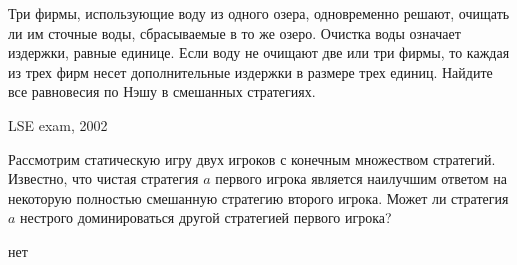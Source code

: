 \begin{problem}[Экология]
\begin{source}
\cite{gintis:gte}\end{source}
Три фирмы, использующие воду из одного озера, одновременно решают, очищать ли им сточные воды, сбрасываемые в то же озеро. Очистка воды означает издержки, равные единице. Если воду не очищают две или три фирмы, то каждая из трех фирм несет дополнительные издержки в размере трех единиц.
Найдите все равновесия по Нэшу в смешанных стратегиях.



\begin{sol}

\end{sol}
\end{problem}







\begin{problem}
\begin{source}
LSE exam, 2002
\end{source}
 Рассмотрим статическую игру двух игроков с конечным множеством стратегий. Известно, что чистая стратегия  $a$  первого игрока является наилучшим ответом на некоторую полностью смешанную стратегию второго игрока.
Может ли стратегия  $a$  нестрого доминироваться другой стратегией первого игрока?

\begin{sol}
нет
\end{sol}
\end{problem}






